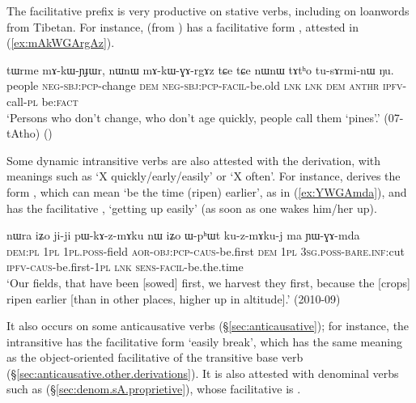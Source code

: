 The facilitative prefix  is very productive on stative verbs, including on loanwords from Tibetan. For instance,  (from ) has a facilitative form , attested in (\ref{ex:mAkWGArgAz}).

\begin{exe}
\ex \label{ex:mAkWGArgAz}
\gll tɯrme mɤ-kɯ-ɲɟɯr, nɯnɯ mɤ-kɯ-ɣɤ-rgɤz tɕe tɕe nɯnɯ tɤtʰo tu-sɤrmi-nɯ ŋu. \\
people \textsc{neg}-\textsc{sbj}:\textsc{pcp}-change \textsc{dem} \textsc{neg}-\textsc{sbj}:\textsc{pcp}-\textsc{facil}-be.old \textsc{lnk} \textsc{lnk} \textsc{dem}  \textsc{anthr} \textsc{ipfv}-call-\textsc{pl} be:\textsc{fact} \\
\glt `Persons who don't change, who don't age quickly, people call them `pines'.' (07-tAtho)
()
\end{exe}


Some dynamic intransitive verbs are also attested with the  derivation, with meanings such as `X quickly/early/easily' or `X often'. For instance,  derives the form , which can mean `be the time (ripen) earlier', as in (\ref{ex:YWGAmda}), and  has the facilitative , `getting up easily' (as soon as one wakes him/her up).

\begin{exe}
\ex \label{ex:YWGAmda}
\gll nɯra iʑo ji-ji pɯ-kɤ-z-mɤku nɯ iʑo ɯ-pʰɯt ku-z-mɤku-j ma ɲɯ-ɣɤ-mda \\
\textsc{dem}:\textsc{pl} \textsc{1pl} \textsc{1pl}.\textsc{poss}-field \textsc{aor}-\textsc{obj}:\textsc{pcp}-\textsc{caus}-be.first \textsc{dem} \textsc{1pl} \textsc{3sg}.\textsc{poss}-\textsc{bare}.\textsc{inf}:cut \textsc{ipfv}-\textsc{caus}-be.first-\textsc{1pl} \textsc{lnk} \textsc{sens}-\textsc{facil}-be.the.time \\
\glt `Our fields, that have been [sowed] first, we harvest they first, because the [crops] ripen earlier [than in other places, higher up in altitude].' (2010-09)
\end{exe}

It also occurs on some anticausative verbs (§\ref{sec:anticausative}); for instance, the intransitive  has the facilitative form  `easily break', which has the same meaning as the object-oriented facilitative  of the transitive base verb  (§\ref{sec:anticausative.other.derivations}). It is also attested with denominal verbs such as  (§\ref{sec:denom.sA.proprietive}), whose facilitative is . 

